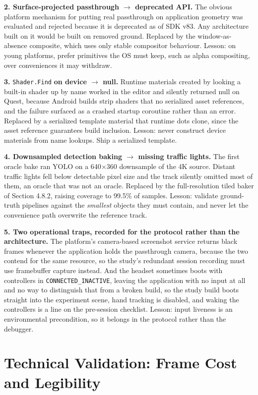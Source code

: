 \textbf{2. Surface-projected passthrough $\rightarrow$ deprecated API.} The obvious platform
mechanism for putting real passthrough on application geometry was evaluated and rejected because it
is deprecated as of SDK v83. Any architecture built on it would be built on removed ground. Replaced
by the window-as-absence composite, which uses only stable compositor behaviour. Lesson: on young
platforms, prefer primitives the OS must keep, such as alpha compositing, over conveniences it may
withdraw.

\textbf{3.} \verb|Shader.Find| \textbf{on device $\rightarrow$ null.} Runtime materials created by looking a
built-in shader up by name worked in the editor and silently returned null on Quest, because Android
builds strip shaders that no serialized asset references, and the failure surfaced as a crashed
startup coroutine rather than an error. Replaced by a serialized template material that
runtime dots clone, since the asset reference guarantees build inclusion. Lesson: never construct
device materials from name lookups. Ship a serialized template.

\textbf{4. Downsampled detection baking $\rightarrow$ missing traffic lights.} The first oracle bake
ran YOLO on a 640$\times$360 downsample of the 4K source. Distant traffic lights fell below detectable
pixel size and the track silently omitted most of them, an oracle that was not an oracle. Replaced by
the full-resolution tiled baker of Section 4.8.2, raising coverage to 99.5\% of samples. Lesson:
validate ground-truth pipelines against the \textit{smallest} objects they must contain, and never
let the convenience path overwrite the reference track.

\textbf{5. Two operational traps, recorded for the protocol rather than the architecture.} The
platform's camera-based screenshot service returns black frames whenever the application holds the
passthrough camera, because the two contend for the same resource, so the study's redundant session
recording must use framebuffer capture instead. And the headset sometimes boots with controllers in
\verb|CONNECTED_INACTIVE|, leaving the application with no input at all and no way to distinguish
that from a broken build, so the study build boots straight into the experiment scene, hand tracking
is disabled, and waking the controllers is a line on the pre-session checklist. Lesson: input
liveness is an environmental precondition, so it belongs in the protocol rather than the debugger.

\section{Technical Validation: Frame Cost and Legibility}
\label{sec:techval}

